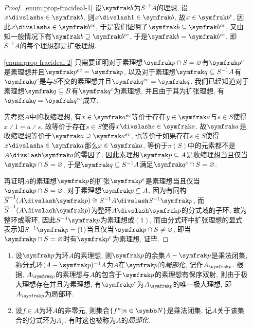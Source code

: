 \begin{proof}
    \ref{enum:prop-fracideal-1} 设$\ideal{b}$为$S^{-1}A$的理想, 设$x{\divslash}s\in \ideal{b}$, 则$x{\divslash}1\in\ideal{b}$, 故$x\in\ideal{b}^c$, 因此$x{\divslash}s\in\ideal{b}^{ce}$, 于是我们证明了$\ideal{b}\subseteq\ideal{b}^{ce}$, 又由知一般情况下有$\ideal{b}\supseteq\ideal{b}^{ce}$, 于是$\ideal{b}=\ideal{b}^{ce}$, 即$S^{-1}A$的每个理想都是扩张理想.

    \ref{enum:prop-fracideal-2} 只需要证明对于素理想$\ideal{p}\cap S=\varnothing$有$\ideal{p}^e$是素理想并且$\ideal{p}^{ec}=\ideal{p}$, 以及对于素理想$\ideal{q}\subseteq S^{-1}A$有$\ideal{q}^c$是与$S$不交的素理想并且$\ideal{q}^{ce}=\ideal{q}$. 我们已经知道对于素理想$\ideal{q}\subseteq B$有$\ideal{q}^c$为素理想, 并且由于其为扩张理想, 有$\ideal{q}=\ideal{q}^{ce}$成立.

    先考察$A$中的收缩理想, 有$x\in\ideal{a}^{ec}$等价于存在$y\in\ideal{a}$与$s\in S$使得$x{\divslash}1=a{\divslash}s$, 故等价于存在$s\in S$使得$x{\divslash}s\in\ideal{a}$. 故$\ideal{a}$是收缩理想等价于$\ideal{a}\supseteq\ideal{a}^{ec}$, 也等价于如果存在$s\in S$使得$x{\divslash}s\in\ideal{a}$那么$x\in\ideal{a}$, 等价于$\pi(S)$中的元素都不是$A{\divslash}\ideal{a}$的零因子. 因此素理想$\ideal{p}\subseteq A$是收缩理想当且仅当$\ideal{p}\cap S=\varnothing$, 于是$\ideal{q}\subseteq S^{-1}A$满足$\ideal{q}^c\cap S=\varnothing$.

    再证明$A$的素理想$\ideal{p}$的扩张$\ideal{p}^e$是素理想当且仅当$\ideal{p}\cap S=\varnothing$. 对于素理想$\ideal{p}\subseteq A$, 因为有同构$\overline{S}^{-1}(A{\divslash}\ideal{p})\cong S^{-1}A{\divslash}S^{-1}\ideal{p}$, 而$\overline{S}^{-1}(A{\divslash}\ideal{p})$为整环$A{\divslash}\ideal{p}$的分式域的子环, 故为整环或零环, 因此$S^{-1}\ideal{p}$为素理想或$(1)$, 而由分式环中扩张理想的显式表示知$S^{-1}\ideal{p}=(1)$当且仅当$\ideal{p}\cap S\neq\varnothing$, 即当$\ideal{p}\cap S=\varnothing$时有$\ideal{p}^e$为素理想, 证毕.
\end{proof}

\begin{example}\leavevmode\vspace{-\baselineskip}%
    \begin{enumerate}
        \item 设$\ideal{p}$为环$A$的素理想, 则$\ideal{p}$的余集$A-\ideal{p}$是乘法闭集, 称分式环$(A-\ideal{p})^{-1}A$为$A$在$\ideal{p}$的\emph{局部化}, 记作$A_{\ideal{p}}$. 根据, $A_{\ideal{p}}$的素理想与$A$的包含于$\ideal{p}$的素理想有保序双射, 则由于极大理想存在并且为素理想, 有$\ideal{p}^e$为$A_{\ideal{p}}$的唯一极大理想, 即$A_{\ideal{p}}$为局部环.
        \item 设$f\in A$为环$A$的非零元, 则集合$\{f^n\vert n\in \NN\}$是乘法闭集, 记$A$关于该集合的分式环为$A_f$. 有时这也被称为$A$的\emph{局部化}.
    \end{enumerate}
\end{example}

